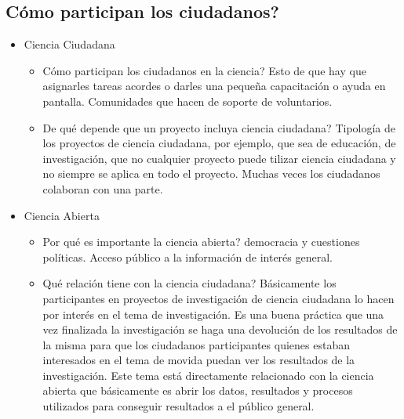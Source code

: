 \subsection{Cómo participan los ciudadanos?}

\begin{itemize}
	\item Ciencia Ciudadana
	\begin{itemize}
		\item Cómo participan los ciudadanos en la ciencia?        
		Esto de que hay que asignarles tareas acordes o darles una pequeña capacitación o ayuda en pantalla. Comunidades que hacen de soporte de voluntarios.
		\item De qué depende que un proyecto incluya ciencia ciudadana?
		Tipología de los proyectos de ciencia ciudadana, por ejemplo, que sea de educación, de investigación, que no cualquier proyecto puede tilizar ciencia ciudadana y no siempre se aplica en todo el proyecto. Muchas veces los ciudadanos colaboran con una parte.
	\end{itemize}   
	\item Ciencia Abierta   
	\begin{itemize}
		\item Por qué es importante la ciencia abierta? democracia y cuestiones políticas. Acceso público a la información de interés general.
		\item Qué relación tiene con la ciencia ciudadana? Básicamente los participantes en proyectos de investigación de ciencia ciudadana lo hacen por interés en el tema de investigación. Es una buena práctica que una vez finalizada la investigación se haga una devolución de los resultados de la misma para que los ciudadanos participantes quienes estaban interesados en el tema de movida puedan ver los resultados de la investigación. Este tema está directamente relacionado con la ciencia abierta que básicamente es abrir los datos, resultados y procesos utilizados para conseguir resultados a el público general.
	\end{itemize}
\end{itemize}

